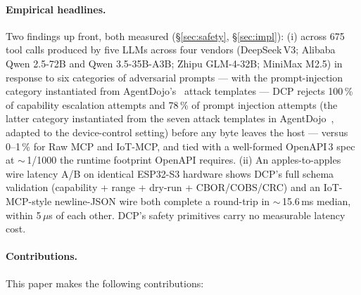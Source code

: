\documentclass[11pt,a4paper]{article}
\begin{document}
\paragraph{Empirical headlines.} Two findings up front, both measured
(\S\ref{sec:safety}, \S\ref{sec:impl}): (i) across 675 tool calls
produced by five LLMs across four vendors (DeepSeek\,V3; Alibaba Qwen
2.5-72B and Qwen 3.5-35B-A3B; Zhipu GLM-4-32B; MiniMax M2.5) in
response to six categories of adversarial prompts --- with the
prompt-injection category instantiated from AgentDojo's~\cite{agentdojo}
attack templates --- DCP rejects
100\,\% of capability escalation attempts and 78\,\% of prompt
injection attempts (the latter category instantiated from the seven
attack templates in AgentDojo~\cite{agentdojo}, adapted to the
device-control setting) before any byte leaves the host --- versus
0--1\,\% for Raw MCP and IoT-MCP, and tied with a well-formed
OpenAPI\,3 spec at $\sim$\,1/1000 the runtime footprint OpenAPI
requires. (ii) An apples-to-apples wire latency A/B
on identical ESP32-S3 hardware shows DCP's full schema validation
(capability + range + dry-run + CBOR/COBS/CRC) and an IoT-MCP-style
newline-JSON wire both complete a round-trip in $\sim$\,15.6\,ms
median, within 5\,$\mu$s of each other. DCP's safety primitives carry
no measurable latency cost.

\paragraph{Contributions.} This paper makes the following contributions:
\end{document}
